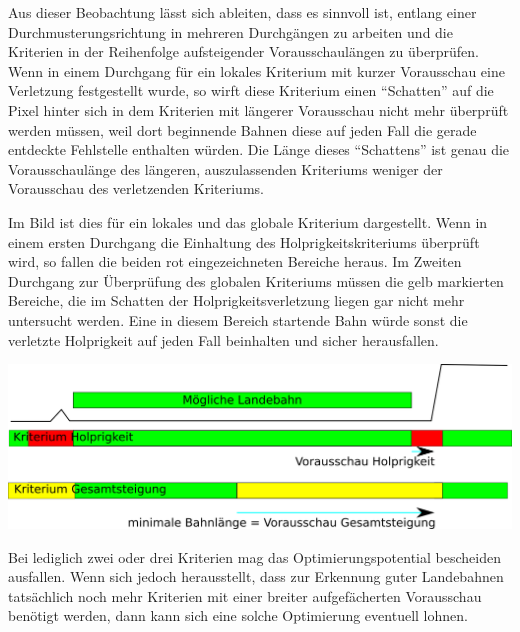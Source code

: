 \documentclass[
11pt, %
a4paper, %
oneside, %
pdfspacing, %
headinclude,
BCOR5mm, %
ngerman, %
bibtotocnumbered,
]{scrartcl}
\begin{document}
Aus dieser Beobachtung lässt sich ableiten, dass es sinnvoll ist, entlang einer Durchmusterungsrichtung in mehreren Durchgängen zu arbeiten und die Kriterien in der Reihenfolge aufsteigender Vorausschaulängen zu überprüfen. Wenn in einem Durchgang für ein lokales Kriterium mit kurzer Vorausschau eine Verletzung festgestellt wurde, so wirft diese Kriterium einen "`Schatten"' auf die Pixel hinter sich in dem Kriterien mit längerer Vorausschau nicht mehr überprüft werden müssen, weil dort beginnende Bahnen diese auf jeden Fall die gerade entdeckte Fehlstelle enthalten würden. Die Länge dieses "`Schattens"' ist genau die Vorausschaulänge des längeren, auszulassenden Kriteriums weniger der Vorausschau des verletzenden Kriteriums.

Im Bild ist dies für ein lokales und das globale Kriterium dargestellt. Wenn in einem ersten Durchgang die Einhaltung des Holprigkeitskriteriums überprüft wird, so fallen die beiden rot eingezeichneten Bereiche heraus. Im Zweiten Durchgang zur Überprüfung des globalen Kriteriums müssen die gelb markierten Bereiche, die im Schatten der Holprigkeitsverletzung liegen gar nicht mehr untersucht werden. Eine in diesem Bereich startende Bahn würde sonst die verletzte Holprigkeit auf jeden Fall beinhalten und sicher herausfallen.

\includegraphics[width=\textwidth]{./drawings/Ausschluss_global.png}


Bei lediglich zwei oder drei Kriterien mag das Optimierungspotential bescheiden ausfallen. Wenn sich jedoch herausstellt, dass zur Erkennung guter Landebahnen tatsächlich noch mehr Kriterien mit einer breiter aufgefächerten Vorausschau benötigt werden, dann kann sich eine solche Optimierung eventuell lohnen.
\end{document}
